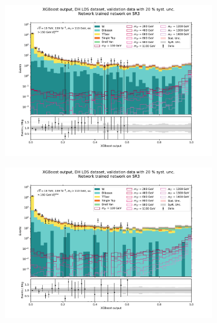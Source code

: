 \documentclass[12pt, a4paper]{book}
\begin{document}
\begin{figure}[!ht]
	\centering
	\begin{subfigure}[b]{0.49\textwidth}
      \centering
      \includegraphics[width=1\textwidth]{XGBoost/Model_independent/150/DH_LDS/VAL_ee.pdf}
   \end{subfigure}
   \hfill
   \begin{subfigure}[b]{0.49\textwidth}
      \centering
      \includegraphics[width=1\textwidth]{XGBoost/Model_independent/150/DH_LDS/VAL_uu.pdf}
   \end{subfigure}
   \hfill
   \begin{subfigure}[b]{0.49\textwidth}
      \centering

\end{subfigure}
\end{figure}
\end{document}

